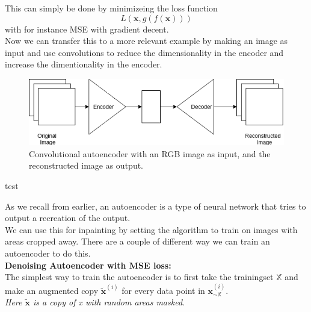 	  This can simply be done by minimizeing the loss function\\
	  \begin{equation}
	    L(\textbf{x},g(f(\textbf{x})))
	  \end{equation}
	  with for instance MSE with gradient decent. \\
	  
	  Now we can transfer this to a more relevant example by making an image as input and use convolutions to reduce the dimensionality in the encoder and increase the dimentionality in the encoder.
	  \vspace{10px}
	  \begin{figure}[ht!]
	    \centering
	    \includegraphics[scale=0.5]{background/figures/CAE.png}
	    \caption{Convolutional autoencoder with an RGB image as input, and the reconstructed image as output.}
	  \end{figure}
	
	\newpage
	test
	
	
	\newpage
	As we recall from earlier, an autoencoder is a type of neural network that tries to output a recreation of the output.\\%
	We can use this for inpainting by setting the algorithm to train on images with areas cropped away.
	There are a couple of different way we can train an autoencoder to do this.\\
	
	
	
	\vspace{10px}
	\textbf{Denoising Autoencoder with MSE loss:}\label{par:Denoising_Autoencoder_with_MSE_loss}\\
	The simplest way to train the autoencoder is to first take the trainingset $\mathds{X}$ and make an augmented copy $\widetilde{\textbf{x}}^{(i)}$ for 
	every data point in $\textbf{x}_{\sim \mathds{X}}^{(i)}$. \\
	\textit{Here $\widetilde{\textbf{x}}$ is a copy of x with random areas masked.}\\
	

